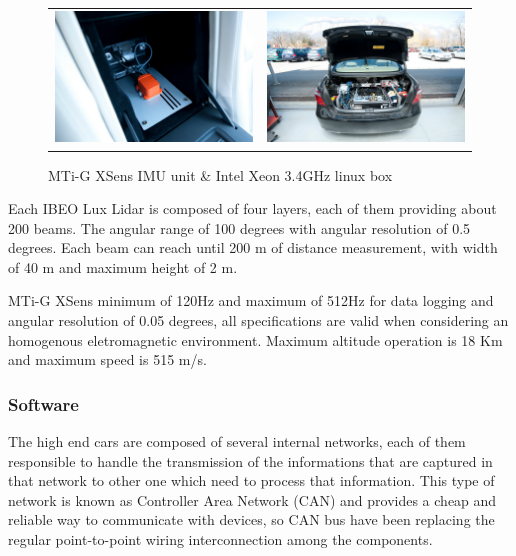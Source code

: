 \begin{figure}[h]
   \centering
     \begin{tabular}{lr}
       \includegraphics[width=0.45\columnwidth]{img/testbed:xsens}
       & \includegraphics[width=0.45\columnwidth]{img/testbed:trunc}
     \end{tabular}
   \caption{MTi-G XSens IMU unit \& Intel Xeon 3.4GHz linux box}
   \label{fig:Lexus}
 \end{figure}

Each IBEO Lux Lidar is composed of four layers, each of them providing about 200 beams. The angular range of 100 degrees with angular resolution of 0.5 degrees. Each beam can reach until 200 m of distance measurement, with width of 40 m and maximum height of 2 m.

MTi-G XSens minimum of 120Hz and maximum of 512Hz for data logging and angular resolution of 0.05 degrees, all specifications are valid when considering an homogenous eletromagnetic environment. Maximum altitude operation is 18 Km and maximum speed is 515 m/s.



\subsubsection*{Software}

The high end cars are composed of several internal networks, each of them responsible to handle the transmission of the informations that are captured in that network to other one which need to process that information. This type of network is known as Controller Area Network (CAN) and provides a cheap and reliable way to communicate with devices, so CAN bus have been replacing the regular point-to-point wiring interconnection among the components\cite{bosch91can}.

